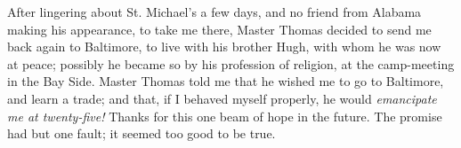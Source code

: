 After lingering about St. Michael's a few days, and no friend from
Alabama making his appearance, to take me there, Master Thomas decided
to send me back again to Baltimore, to live with his brother Hugh, with
whom he was now at peace; possibly he became so by his profession of
religion, at the camp-meeting in the Bay Side. Master Thomas told me
that he wished me to go to Baltimore, and learn a trade; and that, if I
behaved myself properly, he would \emph{emancipate me at twenty-five!}
Thanks for this one beam of hope in the future. The promise had but one
fault; it seemed too good to be true.
